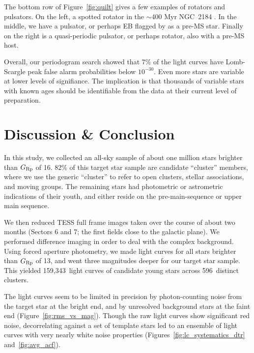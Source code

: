 \documentclass[12pt,twocolumn,tighten]{aastex62}
\newcommand{\numberlcs}{159{,}343\ } %
\newcommand{\numberclusters}{596\ } %
\begin{document}
The bottom row of Figure~\ref{fig:quilt} gives a few examples
of rotators and pulsators.  On the left, a spotted rotator in the
$\sim$400 Myr NGC~2184 \citep{cantat-gaudin_gaia_2018}.
In the middle, we have a pulsator, or perhaps EB flagged by
\citet{zari_3d_2018} as a pre-MS star.
Finally on the right is a quasi-periodic pulsator, or perhaps rotator,
also with a pre-MS host.

Overall, our periodogram search showed that 7\% of the light curves
have Lomb-Scargle peak false alarm probabilities below $10^{-30}$.
Even more stars are variable at lower levels of signifiance.
The implication is that thousands of variable stars with known ages
should be identifiable from the data at their current level of
preparation.




\section{Discussion \& Conclusion}
\label{sec:conclusion}

In this study, we collected an all-sky sample of about one
million stars brighter than $G_{\rm Rp}$ of 16.  82\%
of this target star sample are candidate ``cluster'' members, 
where we use the generic ``cluster'' to refer to 
open clusters, stellar associations, and moving groups.
The remaining stars had photometric or astrometric indications of
their youth, and either reside on the pre-main-sequence or upper main
sequence.

We then reduced TESS full frame images taken over the course of about
two months (Sectors 6 and 7; the first fields close to the
galactic plane).  We performed difference imaging in order to 
deal with the complex background.  Using forced aperture
photometry, we made light curves for all stars brighter than $G_{\rm
Rp}$ of 13, and went three magnitudes deeper for our target star
sample.  This yielded \numberlcs light curves of candidate young stars
across \numberclusters distinct clusters.

The light curves seem to be limited in precision by photon-counting noise 
from the target star at
the bright end, and by unresolved background stars at the faint end
(Figure~\ref{fig:rms_vs_mag}).
Though the raw light curves show significant red noise, decorrelating
against a set of template stars led to an ensemble of light curves
with very nearly white noise properties 
(Figures~\ref{fig:lc_systematics_dtr} and~\ref{fig:avg_acf}).
\end{document}
